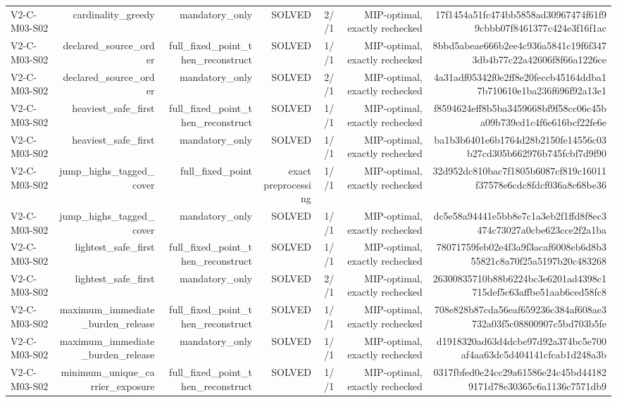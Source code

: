 {\begin{longtable}{lrrrrrr}
V2-C-M03-S02 & cardinality\_greedy & mandatory\_only & SOLVED & 2//1 & MIP-optimal, exactly rechecked & 17f1454a51fc474bb5858ad30967474f61f99cbbb07f8461377c424e3f16f1ac \\
V2-C-M03-S02 & declared\_source\_order & full\_fixed\_point\_then\_reconstruct & SOLVED & 1//1 & MIP-optimal, exactly rechecked & 8bbd5abeae666b2ee4c936a5841c19f6f3473db4b77c22a42606f8f66a1226ce \\
V2-C-M03-S02 & declared\_source\_order & mandatory\_only & SOLVED & 2//1 & MIP-optimal, exactly rechecked & 4a31adf05342f0e2ff8e20feccb45164ddba17b710610e1ba236f696f92a13e1 \\
V2-C-M03-S02 & heaviest\_safe\_first & full\_fixed\_point\_then\_reconstruct & SOLVED & 1//1 & MIP-optimal, exactly rechecked & f8594624eff8b5ba3459668bf9f58cc06c45ba09b739cd1c4f6e616bcf22fe6e \\
V2-C-M03-S02 & heaviest\_safe\_first & mandatory\_only & SOLVED & 1//1 & MIP-optimal, exactly rechecked & ba1b3b6401e6b1764d28b2150fe14556c03b27cd305b662976b745fcbf7d9f90 \\
V2-C-M03-S02 & jump\_highs\_tagged\_cover & full\_fixed\_point & exact preprocessing & 1//1 & MIP-optimal, exactly rechecked & 32d952dc810bac7f1805b6087cf819c16011f37578e6cdc8fdcf036a8c68be36 \\
V2-C-M03-S02 & jump\_highs\_tagged\_cover & mandatory\_only & SOLVED & 1//1 & MIP-optimal, exactly rechecked & dc5e58a94441e5bb8e7c1a3eb2f1ffd8f8ec3474c73027a0cbe623cce2f2a1ba \\
V2-C-M03-S02 & lightest\_safe\_first & full\_fixed\_point\_then\_reconstruct & SOLVED & 1//1 & MIP-optimal, exactly rechecked & 78071759feb02e4f3a9f3acaf6008eb6d8b355821c8a70f25a5197b20c483268 \\
V2-C-M03-S02 & lightest\_safe\_first & mandatory\_only & SOLVED & 2//1 & MIP-optimal, exactly rechecked & 26300835710b88b6224bc3e6201ad4398c1715def5c63affbe51aab6ced58fc8 \\
V2-C-M03-S02 & maximum\_immediate\_burden\_release & full\_fixed\_point\_then\_reconstruct & SOLVED & 1//1 & MIP-optimal, exactly rechecked & 708e828b87cda56eaf659236c384af608ae3732a03f5c08800907c5bd703b5fe \\
V2-C-M03-S02 & maximum\_immediate\_burden\_release & mandatory\_only & SOLVED & 1//1 & MIP-optimal, exactly rechecked & d1918320ad63d4dcbe97d92a374bc5e700af4aa63dc5d404141cfcab1d248a3b \\
V2-C-M03-S02 & minimum\_unique\_carrier\_exposure & full\_fixed\_point\_then\_reconstruct & SOLVED & 1//1 & MIP-optimal, exactly rechecked & 0317fbfed0e24cc29a61586e24c45bd441829171d78e30365c6a1136c7571db9 \\

\end{longtable}}
